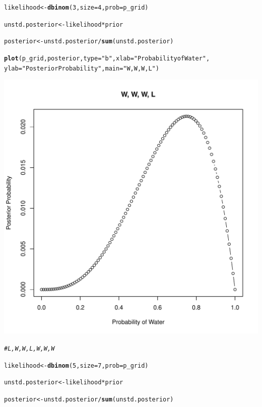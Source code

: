 \documentclass[12pt]{article}\usepackage[]{graphicx}\usepackage[]{color}
\makeatletter
\def\maxwidth{ %
  \ifdim\Gin@nat@width>\linewidth
    \linewidth
  \else
    \Gin@nat@width
  \fi
}
\newcommand{\hlnum}[1]{\textcolor[rgb]{0.686,0.059,0.569}{#1}}%
\newcommand{\hlstr}[1]{\textcolor[rgb]{0.192,0.494,0.8}{#1}}%
\newcommand{\hlcom}[1]{\textcolor[rgb]{0.678,0.584,0.686}{\textit{#1}}}%
\newcommand{\hlopt}[1]{\textcolor[rgb]{0,0,0}{#1}}%
\newcommand{\hlstd}[1]{\textcolor[rgb]{0.345,0.345,0.345}{#1}}%
\newcommand{\hlkwb}[1]{\textcolor[rgb]{0.69,0.353,0.396}{#1}}%
\newcommand{\hlkwc}[1]{\textcolor[rgb]{0.333,0.667,0.333}{#1}}%
\newcommand{\hlkwd}[1]{\textcolor[rgb]{0.737,0.353,0.396}{\textbf{#1}}}%
\newenvironment{kframe}{%
 \def\at@end@of@kframe{}%
 \ifinner\ifhmode%
  \def\at@end@of@kframe{\end{minipage}}%
  \begin{minipage}{\columnwidth}%
 \fi\fi%
 \def\FrameCommand##1{\hskip\@totalleftmargin \hskip-\fboxsep
 \colorbox{shadecolor}{##1}\hskip-\fboxsep
     \hskip-\linewidth \hskip-\@totalleftmargin \hskip\columnwidth}%
 \MakeFramed {\advance\hsize-\width
   \@totalleftmargin\z@ \linewidth\hsize
   \@setminipage}}%
 {\par\unskip\endMakeFramed%
 \at@end@of@kframe}
\newenvironment{knitrout}{}{} %
\makeatother
\begin{document}
\begin{knitrout}
\begin{kframe}
\begin{alltt}
\hlstd{likelihood} \hlkwb{<-} \hlkwd{dbinom}\hlstd{(}\hlnum{3}\hlstd{,} \hlkwc{size} \hlstd{=} \hlnum{4}\hlstd{,} \hlkwc{prob} \hlstd{= p_grid)}

\hlstd{unstd.posterior} \hlkwb{<-} \hlstd{likelihood} \hlopt{*} \hlstd{prior}

\hlstd{posterior} \hlkwb{<-} \hlstd{unstd.posterior}\hlopt{/}\hlkwd{sum}\hlstd{(unstd.posterior)}

\hlkwd{plot}\hlstd{(p_grid, posterior,} \hlkwc{type} \hlstd{=} \hlstr{"b"}\hlstd{,} \hlkwc{xlab} \hlstd{=} \hlstr{"Probability of Water"}\hlstd{,}
     \hlkwc{ylab} \hlstd{=} \hlstr{"Posterior Probability"}\hlstd{,} \hlkwc{main} \hlstd{=} \hlstr{"W, W, W, L"}\hlstd{)}
\end{alltt}
\end{kframe}
\includegraphics[width=\maxwidth]{figure/unnamed-chunk-2-2} 
\begin{kframe}\begin{alltt}
\hlcom{#L, W, W, L, W, W, W}

\hlstd{likelihood} \hlkwb{<-} \hlkwd{dbinom}\hlstd{(}\hlnum{5}\hlstd{,} \hlkwc{size} \hlstd{=} \hlnum{7}\hlstd{,} \hlkwc{prob} \hlstd{= p_grid)}

\hlstd{unstd.posterior} \hlkwb{<-} \hlstd{likelihood} \hlopt{*} \hlstd{prior}

\hlstd{posterior} \hlkwb{<-} \hlstd{unstd.posterior}\hlopt{/}\hlkwd{sum}\hlstd{(unstd.posterior)}


\end{alltt}
\end{kframe}
\end{knitrout}
\end{document}
